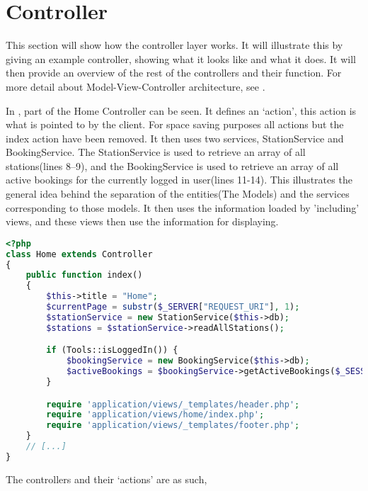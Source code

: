 \section{Controller}
This section will show how the controller layer works. 
It will illustrate this by giving an example controller, showing what it looks like and what it does.
It will then provide an overview of the rest of the controllers and their function.
For more detail about Model-View-Controller architecture, see .

In , part of the Home Controller can be seen. 
It defines an `action', this action is what is pointed to by the client. 
For space saving purposes all actions but the index action have been removed.
It then uses two services, StationService and BookingService. 
The StationService is used to retrieve an array of all stations(lines 8--9), and the BookingService is used to retrieve an array of all active bookings for the currently logged in user(lines 11-14). 
This illustrates the general idea behind the separation of the entities(The Models) and the services corresponding to those models.
It then uses the information loaded by 'including' views, and these views then use the information for displaying.

\begin{lstlisting}[language=php, label=lst:homeController, caption={Home Controller Class}]
<?php
class Home extends Controller
{
    public function index()
    {
        $this->title = "Home";
        $currentPage = substr($_SERVER["REQUEST_URI"], 1);
        $stationService = new StationService($this->db);
        $stations = $stationService->readAllStations();

        if (Tools::isLoggedIn()) {
            $bookingService = new BookingService($this->db);
            $activeBookings = $bookingService->getActiveBookings($_SESSION["login_user"]);
        }

        require 'application/views/_templates/header.php';
        require 'application/views/home/index.php';
        require 'application/views/_templates/footer.php';
    }
    // [...]
}
\end{lstlisting}

The controllers and their `actions' are as such,

